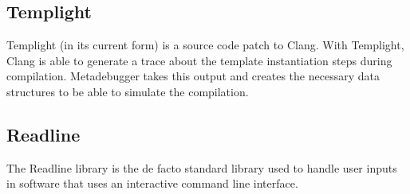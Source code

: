 \subsection{Templight}

Templight\cite{templight} (in its current form) is a source code patch to
Clang. With Templight, Clang is able to generate a trace about the template
instantiation steps during compilation. Metadebugger takes this output and
creates the necessary data structures to be able to simulate the compilation.

\subsection{Readline}

The Readline library\cite{readline} is the de facto standard library used to
handle user inputs in software that uses an interactive command line interface.

